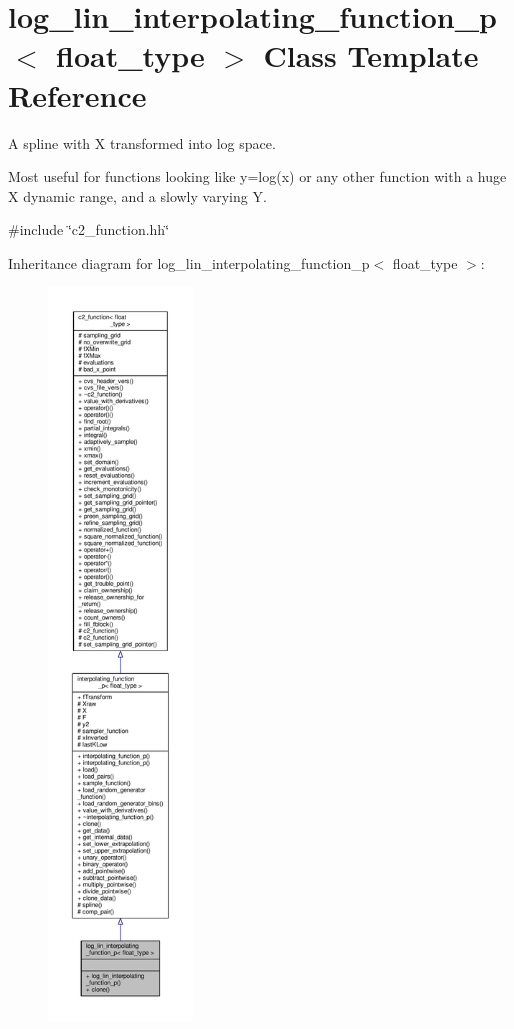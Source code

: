 \hypertarget{classlog__lin__interpolating__function__p}{}\section{log\+\_\+lin\+\_\+interpolating\+\_\+function\+\_\+p$<$ float\+\_\+type $>$ Class Template Reference}
\label{classlog__lin__interpolating__function__p}


A spline with X transformed into log space.

Most useful for functions looking like y=log(x) or any other function with a huge X dynamic range, and a slowly varying Y.  




{\ttfamily \#include \char`\"{}c2\+\_\+function.\+hh\char`\"{}}



Inheritance diagram for log\+\_\+lin\+\_\+interpolating\+\_\+function\+\_\+p$<$ float\+\_\+type $>$\+:
\nopagebreak
\begin{figure}[H]
\begin{center}
\leavevmode
\includegraphics[height=550pt]{classlog__lin__interpolating__function__p__inherit__graph}
\end{center}
\end{figure}


